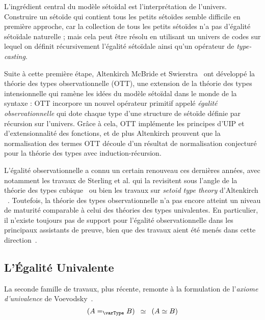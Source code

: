 L'ingrédient central du modèle sétoïdal est l'interprétation de l'univers. 
% 
Construire un sétoïde qui contient tous les petits sétoïdes semble difficile 
en première approche, car la collection de tous les petits sétoïdes n'a pas 
d'égalité sétoïdale naturelle ; mais cela peut être résolu en utilisant un univers 
de codes sur lequel on définit récursivement l'égalité sétoïdale 
ainsi qu'un opérateur de \emph{type-casting}.

Suite à cette première étape, Altenkirch McBride et 
Swierstra~ ont développé la théorie des types 
observationnelle (OTT), une extension de la théorie des types intensionnelle 
qui ramène les idées du modèle sétoïdal dans le monde de la syntaxe : 
% 
OTT incorpore un nouvel opérateur primitif appelé 
\emph{égalité observationnelle} qui dote chaque type d'une structure de sétoïde 
définie par récursion sur l'univers. 
% 
Grâce à cela, OTT implémente les principes d'UIP et d'extensionnalité des 
fonctions, et de plus Altenkirch \etal prouvent que la normalisation des termes 
OTT découle d'un résultat de normalisation conjecturé pour la théorie des types 
avec induction-récursion.

L'égalité observationnelle a connu un certain renouveau ces dernières années, 
avec notamment les travaux de Sterling et al. qui la revisitent sous l'angle 
de la théorie des types cubique~ ou bien
les travaux sur \emph{setoid type theory} d'Altenkirch \etal~. 
% 
Toutefois, la théorie des types observationnelle n'a pas encore atteint un niveau 
de maturité comparable à celui des théories des types univalentes. 
% 
En particulier, il n'existe toujours pas de support pour l'égalité 
observationnelle dans les principaux assistants de preuve, bien que des
travaux aient été menés dans cette direction~.

\subsection{L'Égalité Univalente}

La seconde famille de travaux, plus récente, remonte à la formulation de
l'\emph{axiome d'univalence} de Voevodsky~.
\[
(A =_{\varType} B) \enskip \simeq \enskip  (A \simeq B)
\]

